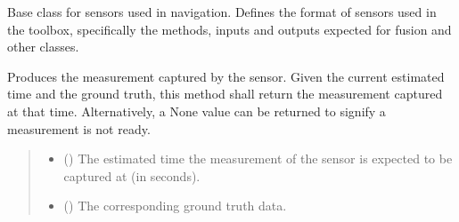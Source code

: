 \documentclass[letterpaper,10pt,english]{sphinxmanual}
\begin{document}
\begin{fulllineitems}
\label{\detokenize{modules/measurement/sensor:qnav.measurement.sensor.Sensor}}
\pysigstartsignatures
{}
\pysigstopsignatures
\sphinxAtStartPar
Base class for sensors used in navigation.
Defines the format of sensors used in the toolbox, specifically the
methods, inputs and outputs expected for fusion and other classes.

\begin{fulllineitems}
\label{\detokenize{modules/measurement/sensor:qnav.measurement.sensor.Sensor.take_measurement}}
\pysigstartsignatures
{}
\pysigstopsignatures
\sphinxAtStartPar
Produces the measurement captured by the sensor.
Given the current estimated time and the ground truth, this method
shall return the measurement captured at that time. Alternatively, a
None value can be returned to signify a measurement is not ready.
\begin{quote}\begin{description}
\begin{itemize}
\item {} 
\sphinxAtStartPar
{} () \textendash{} The estimated time the measurement of the sensor
is expected to be captured at (in seconds).

\item {} 
\sphinxAtStartPar
{} ({\hyperref[\detokenize{modules/waypoints/trajectory:qnav.waypoints.trajectory.GroundTruth}]{}}) \textendash{} The corresponding ground truth data.


\end{itemize}
\end{description}
\end{quote}
\end{fulllineitems}
\end{fulllineitems}
\end{document}
